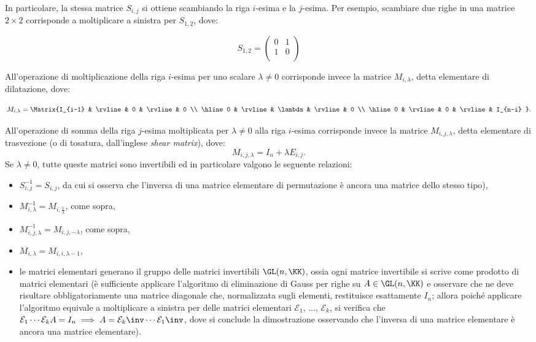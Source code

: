 \documentclass[10pt,landscape]{article}
\begin{document}
\begin{multicols}{3}
		In particolare, la stessa matrice $S_{i,j}$ si ottiene scambiando la riga $i$-esima e la $j$-esima. Per esempio, scambiare due righe in una matrice $2 \times 2$ corrisponde a
		moltiplicare a sinistra per $S_{1,2}$, dove:
		
		\[S_{1,2}=\begin{pmatrix}
			0 & 1 \\
			1 & 0 \\
		\end{pmatrix}\]
		
		All'operazione di moltiplicazione della riga $i$-esima per uno scalare $\lambda \neq 0$ corrisponde invece la matrice $M_{i, \lambda}$, detta elementare di dilatazione, dove:
		
		\[ M_{i,\lambda} = \Matrix{I_{i-1} & \rvline & 0 & \rvline & 0 \\ \hline 0 & \rvline & \lambda & \rvline & 0 \\ \hline 0 & \rvline & 0 & \rvline & I_{n-i} }. \]
		
		All'operazione di somma della riga $j$-esima moltiplicata per $\lambda \neq 0$ alla riga $i$-esima corrisponde invece la matrice $M_{i,j,\lambda}$, detta elementare di trasvezione (o di tosatura, dall'inglese \textit{shear matrix}), dove:
		\[M_{i,j,\lambda}=I_n+\lambda E_{i,j}.\]
		Se $\lambda \neq 0$, tutte queste matrici sono invertibili ed in particolare valgono le seguente relazioni:
		\begin{itemize}
			\item $S_{i,j}^{-1}=S_{i,j}$, da cui si osserva che l'inversa di una matrice elementare di permutazione è ancora una matrice dello stesso tipo),
			\item $M_{i,\lambda}^{-1}=M_{i,\frac{1}{\lambda}}$, come sopra,
			\item $M_{i,j,\lambda}^{-1}=M_{i,j,-\lambda}$, come sopra,
			\item $M_{i,\lambda} = M_{i, i, \lambda-1}$,
			\item le matrici elementari generano il gruppo delle matrici invertibili $\GL(n, \KK)$, ossia ogni matrice
			invertibile si scrive come prodotto di matrici elementari (è sufficiente
			applicare l'algoritmo di eliminazione di Gauss per righe su $A \in \GL(n, \KK)$ e
			osservare che ne deve risultare obbligatoriamente una matrice diagonale che,
			normalizzata sugli elementi, restituisce esattamente $I_n$; allora poiché applicare l'algoritmo
			equivale a moltiplicare a sinistra per delle matrici elementari $\mathcal{E}_1$, ..., $\mathcal{E}_k$, si verifica che $\mathcal{E}_1 \cdots \mathcal{E}_k A = I_n \implies A = \mathcal{E}_k \inv \cdots \mathcal{E}_1 \inv$, dove si
			conclude la dimostrazione osservando che l'inversa di una matrice elementare
			è ancora una matrice elementare).
		\end{itemize}
		

\end{multicols}
\end{document}
